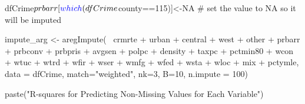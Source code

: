 \documentclass[]{article}
\newenvironment{Shaded}{}{}
\newcommand{\CommentTok}[1]{\textcolor[rgb]{0.00,0.50,0.00}{#1}}
\newcommand{\DataTypeTok}[1]{#1}
\newcommand{\DecValTok}[1]{#1}
\newcommand{\KeywordTok}[1]{\textcolor[rgb]{0.00,0.00,1.00}{#1}}
\newcommand{\NormalTok}[1]{#1}
\newcommand{\OperatorTok}[1]{#1}
\newcommand{\OtherTok}[1]{\textcolor[rgb]{1.00,0.25,0.00}{#1}}
\newcommand{\StringTok}[1]{\textcolor[rgb]{0.00,0.50,0.50}{#1}}
\begin{document}
\begin{Shaded}
\begin{Highlighting}[]
\NormalTok{dfCrime}\OperatorTok{$}\NormalTok{prbarr[}\KeywordTok{which}\NormalTok{(dfCrime}\OperatorTok{$}\NormalTok{county}\OperatorTok{==}\DecValTok{115}\NormalTok{)]<-}\OtherTok{NA} \CommentTok{# set the value to NA so it will be imputed}
\end{Highlighting}
\end{Shaded}

\begin{Shaded}
\begin{Highlighting}[]
\NormalTok{impute_arg <-}\StringTok{ }\KeywordTok{aregImpute}\NormalTok{(}\OperatorTok{~}\StringTok{ }\NormalTok{crmrte }\OperatorTok{+}\StringTok{  }\NormalTok{urban }\OperatorTok{+}\StringTok{ }\NormalTok{central }\OperatorTok{+}\StringTok{ }\NormalTok{west }\OperatorTok{+}\StringTok{ }\NormalTok{other }\OperatorTok{+}
\StringTok{                         }\NormalTok{prbarr }\OperatorTok{+}\StringTok{ }\NormalTok{prbconv }\OperatorTok{+}\StringTok{ }\NormalTok{prbpris }\OperatorTok{+}\StringTok{ }\NormalTok{avgsen }\OperatorTok{+}\StringTok{ }\NormalTok{polpc }\OperatorTok{+}
\StringTok{                         }\NormalTok{density }\OperatorTok{+}\StringTok{ }\NormalTok{taxpc }\OperatorTok{+}\StringTok{ }\NormalTok{pctmin80 }\OperatorTok{+}\StringTok{ }\NormalTok{wcon }\OperatorTok{+}\StringTok{ }\NormalTok{wtuc }\OperatorTok{+}
\StringTok{                         }\NormalTok{wtrd }\OperatorTok{+}\StringTok{ }\NormalTok{wfir }\OperatorTok{+}\StringTok{ }\NormalTok{wser }\OperatorTok{+}\StringTok{ }\NormalTok{wmfg }\OperatorTok{+}\StringTok{ }\NormalTok{wfed }\OperatorTok{+}\StringTok{ }\NormalTok{wsta }\OperatorTok{+}\StringTok{ }\NormalTok{wloc }\OperatorTok{+}
\StringTok{                         }\NormalTok{mix }\OperatorTok{+}\StringTok{ }\NormalTok{pctymle, }\DataTypeTok{data =}\NormalTok{ dfCrime, }\DataTypeTok{match=}\StringTok{"weighted"}\NormalTok{,}
                         \DataTypeTok{nk=}\DecValTok{3}\NormalTok{, }\DataTypeTok{B=}\DecValTok{10}\NormalTok{, }\DataTypeTok{n.impute =} \DecValTok{100}\NormalTok{)}
\end{Highlighting}
\end{Shaded}

\begin{Shaded}
\begin{Highlighting}[]
\KeywordTok{paste}\NormalTok{(}\StringTok{"R-squares for Predicting Non-Missing Values for Each Variable"}\NormalTok{)}
\end{Highlighting}
\end{Shaded}
\end{document}
